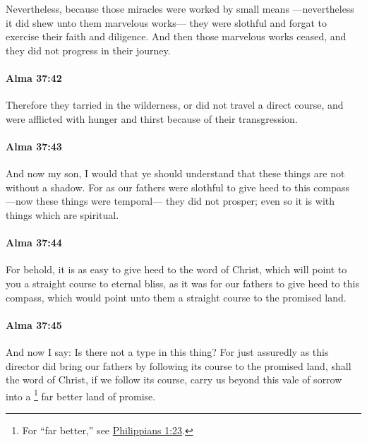 			Nevertheless, because those miracles were worked by small means
			---nevertheless it did shew unto them marvelous works---
			they were slothful and forgat to exercise their faith and diligence.
			And then those marvelous works ceased,
			and they did not progress in their journey.

		\paragraph{Alma 37:42} %
			\label{ALMA-37-42}

			Therefore they tarried in the wilderness,
			or did not travel a direct course,
			and were afflicted with hunger and thirst because of their transgression.

		\paragraph{Alma 37:43} %
			\label{ALMA-37-43}

			And now my son, I would that ye should understand
			that these things are not without a shadow.
			For as our fathers were slothful to give heed to this compass
			---now these things were temporal---
			they did not prosper;
			even so it is with things which are spiritual.

		\paragraph{Alma 37:44} %
			\label{ALMA-37-44}

			For behold, it is as easy to give heed to the word of Christ,
			which will point to you a straight course to eternal bliss,
			as it was for our fathers to give heed to this compass,
			which would point unto them a straight course to the promised land.

		\paragraph{Alma 37:45} %
			\label{ALMA-37-45}

			And now I say:
			Is there not a type in this thing?
			For just assuredly as this director did bring our fathers
			by following its course to the promised land,
			shall the word of Christ, if we follow its course, carry us
			beyond this vale of sorrow into a
				\footnote{%
					For ``far better,'' see \hyperref[PHILIPPIANS-1-23]{Philippians 1:23}.
					}%
			far better land of promise.

